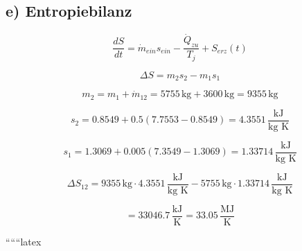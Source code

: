 \subsection*{e) Entropiebilanz}

\[
\frac{dS}{dt} = \dot{m}_{ein} s_{ein} - \frac{\dot{Q}_{zu}}{T_j} + S_{erz}(t)
\]

\[
\Delta S = m_2 s_2 - m_1 s_1
\]

\[
m_2 = m_1 + \dot{m}_{12} = 5755 \, \text{kg} + 3600 \, \text{kg} = 9355 \, \text{kg}
\]

\[
s_2 = 0.8549 + 0.5 (7.7553 - 0.8549) = 4.3551 \, \frac{\text{kJ}}{\text{kg K}}
\]

\[
s_1 = 1.3069 + 0.005 (7.3549 - 1.3069) = 1.33714 \, \frac{\text{kJ}}{\text{kg K}}
\]

\[
\Delta S_{12} = 9355 \, \text{kg} \cdot 4.3551 \, \frac{\text{kJ}}{\text{kg K}} - 5755 \, \text{kg} \cdot 1.33714 \, \frac{\text{kJ}}{\text{kg K}}
\]

\[
= 33046.7 \, \frac{\text{kJ}}{\text{K}} = 33.05 \, \frac{\text{MJ}}{\text{K}}
\]

``````latex